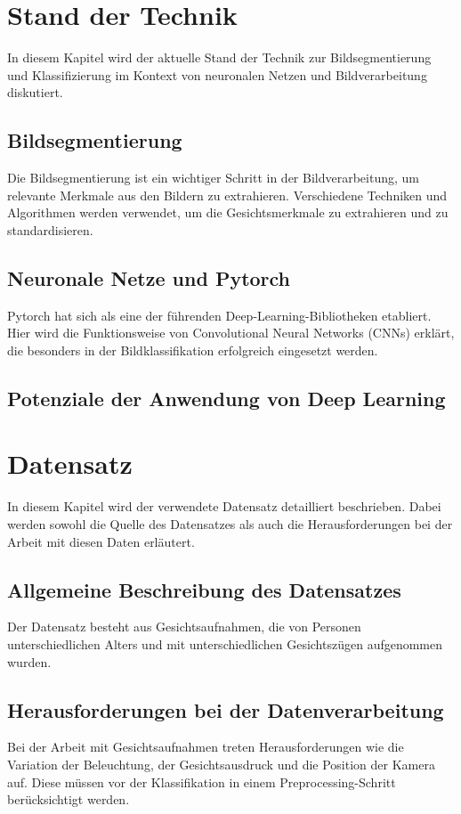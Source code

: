 \documentclass[journal,twoside,web]{ieeecolor}
\begin{document}
\section{Stand der Technik}
In diesem Kapitel wird der aktuelle Stand der Technik zur Bildsegmentierung und Klassifizierung im Kontext von neuronalen Netzen und Bildverarbeitung diskutiert.

\subsection{Bildsegmentierung}
Die Bildsegmentierung ist ein wichtiger Schritt in der Bildverarbeitung, um relevante Merkmale aus den Bildern zu extrahieren. Verschiedene Techniken und Algorithmen werden verwendet, um die Gesichtsmerkmale zu extrahieren und zu standardisieren.

\subsection{Neuronale Netze und Pytorch}
Pytorch hat sich als eine der führenden Deep-Learning-Bibliotheken etabliert. Hier wird die Funktionsweise von Convolutional Neural Networks (CNNs) erklärt, die besonders in der Bildklassifikation erfolgreich eingesetzt werden.

\subsection{Potenziale der Anwendung von Deep Learning}

\section{Datensatz}
In diesem Kapitel wird der verwendete Datensatz detailliert beschrieben. Dabei werden sowohl die Quelle des Datensatzes als auch die Herausforderungen bei der Arbeit mit diesen Daten erläutert.

\subsection{Allgemeine Beschreibung des Datensatzes}
Der Datensatz besteht aus Gesichtsaufnahmen, die von Personen unterschiedlichen Alters und mit unterschiedlichen Gesichtszügen aufgenommen wurden.

\subsection{Herausforderungen bei der Datenverarbeitung}
Bei der Arbeit mit Gesichtsaufnahmen treten Herausforderungen wie die Variation der Beleuchtung, der Gesichtsausdruck und die Position der Kamera auf. Diese müssen vor der Klassifikation in einem Preprocessing-Schritt berücksichtigt werden.
\end{document}
